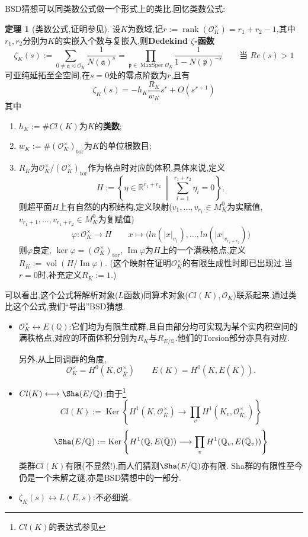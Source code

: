 \documentclass[12pt,A4paper,oneside,reqno]{amsart}
\numberwithin{equation}{section}
\theoremstyle{definition}
\newtheorem{theorem}{定理}[section]
\theoremstyle{plain}
\theoremstyle{plain}
\numberwithin{equation}{section}
\theoremstyle{remark}
\DeclareMathOperator{\vol}{vol}
\DeclareMathOperator{\rank}{\operatorname{rank}}
\DeclareMathOperator{\Ker}{\operatorname{Ker}}
\DeclareMathOperator{\Img}{\operatorname{Im}}
\DeclareMathOperator{\tor}{\operatorname{tor}}
\newcommand{\MaxSpec}{\operatorname{MaxSpec}}
\begin{document}
BSD猜想可以同类数公式做一个形式上的类比.回忆类数公式:
\begin{theorem}[类数公式,证明参见{\cite[p217, 定理7.10]{fermat2013dream}}]
	设$K$为数域,记$r:=\rank (\mathcal{O}_K^{\times})=r_1+r_2-1$,其中$r_1,r_2$分别为$K$的实嵌入个数与复嵌入,则\textbf{Dedekind $\zeta$-函数}
	$$\zeta_K(s):=\sum_{0 \neq \mathfrak{a} \vartriangleleft \mathcal{O}_K}\frac{1}{N(\mathfrak{a})^{s}}=\prod_{\mathfrak{p} \in \MaxSpec \mathcal{O}_K} \frac{1}{1-N(\mathfrak{p})^{-s}} \qquad \text{当 }Re(s)>1 $$
	可亚纯延拓至全空间,在$s=0$处的零点阶数为$r$,且有
	$$\zeta_K(s)=-h_K\frac{R_K}{w_K}s^r+O(s^{r+1})$$
	其中
	\begin{enumerate}
		\item $h_K:=\#Cl(K)$为$K$的\textbf{类数};
		\item $w_K:=\#(\mathcal{O}_K^{\times})_{\tor}$为$K$的单位根数目;
		\item $R_K$为$\mathcal{O}_K^{\times}/(\mathcal{O}_K^{\times})_{\tor}$作为格点时对应的体积,具体来说,定义
		$$H:=\left\{\eta \in \mathbb{R}^{r_1+r_2} \;\middle|\; \sum_{i=1}^{r_1+r_2}\eta_i=0 \right\}, $$
		则超平面$H$上有自然的内积结构,定义映射($v_1,\ldots,v_{r_1} \in M_K^0$为实赋值, $v_{r_1+1},\ldots ,v_{r_1+r_2} \in M_K^0$为复赋值)
		$$\varphi:\mathcal{O}_K^{\times} \longrightarrow H \qquad x \longmapsto \big(ln(|x|_{v_1}), \ldots, ln(|x|_{v_{r_1+r_2}})\big)$$
		则$\varphi$良定, $\ker \varphi =(\mathcal{O}_K^{\times})_{\tor}$, $\Img \varphi$为$H$上的一个满秩格点,定义$R_K:=\vol(H/\Img \varphi)$. (这个映射在证明$\mathcal{O}_K^{\times}$的有限生成性时即已出现过.当$r=0$时,补充定义$R_K:=1$.)
	\end{enumerate}
\end{theorem}
可以看出,这个公式将解析对象($L$函数)同算术对象($Cl(K),\mathcal{O}_K$)联系起来.通过类比这个公式,我们“导出”BSD猜想.
\begin{itemize}
	\item $\mathcal{O}_K^{\times} \longleftrightarrow E(\mathbb{Q})$:它们均为有限生成群,且自由部分均可实现为某个实内积空间的满秩格点,对应的环面体积分别为$R_K$与$R_{E/\mathbb{Q}}$.他们的Torsion部分亦具有对应.
	
	另外,从上同调群的角度,
	$$\mathcal{O}_K^{\times}=H^0(K,\mathcal{O}_{\bar{K}}^{\times}) \qquad E(K)=H^0(K,E(\bar{K})).$$
	\item $Cl(K) \longleftrightarrow \Sha (E/\mathbb{Q})$:由于\footnote{$Cl(K)$的表达式参见\cite[Proposition 6]{kb2012classgroup}}
	$$Cl(K):=\Ker \left\{H^1(K,\mathcal{O}_{\bar{K}}^{\times}) \longrightarrow \prod_{v}H^1(K_v,\mathcal{O}_{\bar{K}_v}^{\times}) \right\}$$
	$$\Sha(E/\mathbb{Q}):=\Ker \left\{H^1(\mathbb{Q},E(\bar{\mathbb{Q}})) \longrightarrow \prod_{v}H^1(\mathbb{Q}_v,E(\bar{\mathbb{Q}}_v)) \right\}$$
	类群$Cl(K)$有限(不显然!),而人们猜测$\Sha (E/\mathbb{Q})$亦有限. Sha群的有限性至今仍是一个未解之谜,亦是BSD猜想中的一部分.
	\item $\zeta_K(s) \longleftrightarrow L(E,s)$:不必细说.
\end{itemize}
\end{document}
